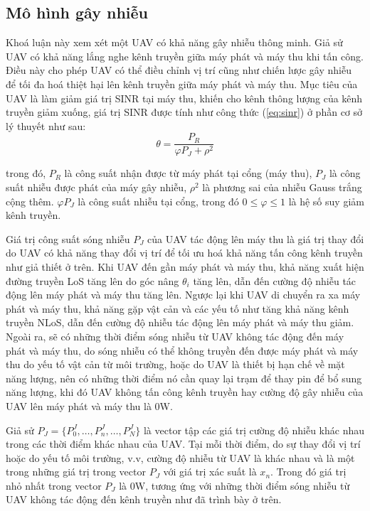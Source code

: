 \documentclass{uetgraduation}
\begin{document}
\subsection{Mô hình gây nhiễu}
Khoá luận này xem xét một UAV có khả năng gây nhiễu thông minh. Giả sử UAV có khả năng lắng nghe kênh truyền giữa máy phát và máy thu khi tấn công. Điều này cho phép UAV có thể điều chỉnh vị trí
cũng như chiến lược gây nhiễu để tối đa hoá thiệt hại lên kênh truyền giữa máy phát và máy thu. Mục tiêu của UAV là làm giảm giá trị SINR tại máy thu, khiến cho kênh thông lượng của kênh
truyền giảm xuống, giá trị SINR được tính như công thức (\ref{eq:sinr}) ở phần cơ sở lý thuyết như sau:
\begin{equation}
    \theta = \frac{P_R}{\varphi P_J + \rho^2}
\end{equation}

trong đó, $P_R$ là công suất nhận được từ máy phát tại cổng (máy thu), $P_J$ là công suất nhiễu được phát của máy gây nhiễu, $\rho^2$ là phương sai của nhiễu Gauss trắng cộng thêm. 
$\varphi P_J$ là công suất nhiễu tại cổng, trong đó $0 \leq \varphi \leq 1$ là hệ số suy giảm kênh truyền.

Giá trị công suất sóng nhiễu $P_J$ của UAV tác động lên máy thu là giá trị thay đổi do UAV có khả năng thay đổi vị trí để tối ưu hoá khả năng tấn công kênh truyền như giả thiết ở trên.
Khi UAV đến gần máy phát và máy thu, khả năng xuất hiện đường truyền LoS tăng lên do góc nâng $\theta_i$
tăng lên, dẫn đến cường độ nhiễu tác động lên máy phát và máy thu tăng lên. Ngược lại khi UAV di chuyển ra xa máy phát và máy thu, khả năng gặp vật cản và các yếu tố như tăng khả năng kênh
truyền NLoS, dẫn đến cường độ nhiễu tác động lên máy phát và máy thu giảm. Ngoài ra, sẽ có những thời điểm sóng nhiễu từ UAV không tác động đến máy phát và máy thu, do sóng nhiễu có thể không
truyền đến được máy phát và máy thu do yếu tố vật cản từ môi trường, hoặc do UAV là thiết bị hạn chế về mặt năng lượng, nên có những thời điểm nó cần quay lại trạm để thay pin để bổ sung năng
lượng, khi đó UAV không tấn công kênh truyền hay cường độ gây nhiễu của UAV lên máy phát và máy thu là 0W.

Giả sử $P_J = \{P_0^J, \dots, P_n^J, \dots, P_N^J\}$ là vector tập các giá trị cường độ nhiễu khác nhau trong các thời điểm khác nhau của UAV. Tại mỗi thời điểm, do sự thay đổi vị trí
hoặc do yếu tố môi trường, v.v, cường độ nhiễu từ UAV là khác nhau và là một trong những giá trị trong vector $P_J$ với giá trị xác suất là $x_n$. Trong đó giá trị nhỏ nhất trong vector $P_J$
là 0W, tương ứng với những thời điểm sóng nhiễu từ UAV không tác động đến kênh truyền như đã trình bày ở trên.
\end{document}
